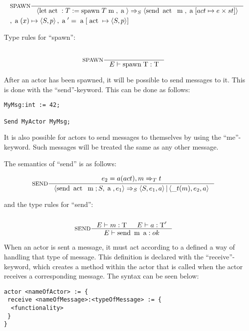 \begin{align*}
&\inference[$\text{SPAWN}$]{}
                       {\Braket{\Tlet \Tact:T := \Tspawn \; T \Tm,\Ta} \Rightarrow_S \Braket{\Tsend \Tact \Tm,\Ta[act \mapsto e \times st]}}
\\
&                       {, \Ta(x) \mapsto \Braket{S,p} , \Ta' = \Ta[\Tact \mapsto \Braket{S, p}]}
\end{align*}

Type rules for \enquote{spawn}:

\begin{align*}
\intertext{}
&\inference[SPAWN]{}
                 {\Tenv \mathbin{\text{spawn}} \; \Tt: \Tt}
\end{align*}

After an actor has been spawned, it will be possible to send messages to it. This is done with the \enquote{send}-keyword. This can be done as follows:

\label{actorfuncSend}
\begin{lstlisting}
MyMsg:int := 42;

Send MyActor MyMsg;
\end{lstlisting}

It is also possible for actors to send messages to themselves by using the \enquote{me}-keyword. Such messages will be treated the same as any other message.

The semantics of \enquote{send} is as follows:

\begin{align*}
&\inference[$\text{SEND}$]{e_2 = a(act),m \Rightarrow_T t}
                       {\Braket{\Tsend \Tact \Tm ; S,\Ta,e_1} \Rightarrow_S \Braket{S,e_1,a}|\Braket{\_t(m),e_2,a}}
\end{align*}

and the type rules for \enquote{send}:

\begin{align*}
\intertext{}
&\inference[SEND]{\Tenv m : \Tt & \Tenv a: \Tt'}
                 {\Tenv \mathbin{\text{send}} \; \mathbin{\text{m}} \; \mathbin{\text{a}} : ok }
\end{align*}

When an actor is sent a message, it must act according to a defined a way of handling that type of message. This definition is declared with the \enquote{receive}-keyword, which creates a method within the actor that is called when the actor receives a corresponding message. The syntax can be seen below:

\label{actorfuncReceive}
\begin{lstlisting}
actor <nameOfActor> := {
 receive <nameOfMessage>:<typeOfMessage> := {
  <functionality>
 }
}
\end{lstlisting}

